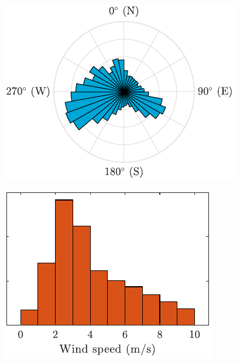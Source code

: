 \documentclass[generic]{tudposter} %
\begin{document}
\begin{multicols}{2}
\begin{minipage}{\linewidth}
	\centering
	\vspace{5mm}
	\begin{minipage}[b]{.55\linewidth}
	\includegraphics[width=\textwidth]{images/histogram_wd.pdf}
	\end{minipage}
	\begin{minipage}[b]{.42\linewidth}
	\includegraphics[width=\textwidth]{images/histogram_ws.pdf}	
	\end{minipage}
	\vspace{2cm}
\end{minipage}


\end{multicols}
\end{document}
